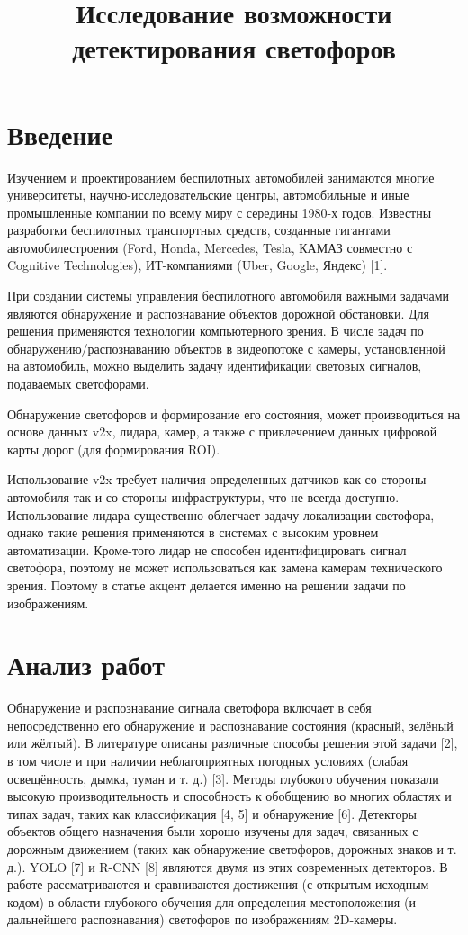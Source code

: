 \documentclass{misisarticle}
\title{Исследование возможности детектирования светофоров}
\begin{document}
\maketitle

\section{Введение}

Изучением и проектированием беспилотных автомобилей занимаются многие университеты, научно-исследовательские центры, автомобильные и иные промышленные компании по всему миру с середины 1980-х годов. Известны разработки беспилотных транспортных средств, созданные гигантами автомобилестроения (Ford, Honda, Mercedes, Tesla, КАМАЗ совместно с Cognitive Technologies), ИТ-компаниями (Uber, Google, Яндекс) [1].

При создании системы управления беспилотного автомобиля важными задачами являются обнаружение и распознавание объектов дорожной обстановки. Для решения применяются технологии компьютерного зрения. В числе задач по обнаружению/распознаванию объектов в видеопотоке с камеры, установленной на автомобиль, можно выделить задачу идентификации световых сигналов, подаваемых светофорами.

Обнаружение светофоров и формирование его состояния, может производиться на основе данных v2x, лидара, камер, а также с привлечением данных цифровой карты дорог (для формирования ROI).

Использование v2x требует наличия определенных датчиков как со стороны автомобиля так и со стороны инфраструктуры, что не всегда доступно. 
Использование лидара существенно облегчает задачу локализации светофора, однако такие решения применяются в системах с высоким уровнем автоматизации. Кроме-того лидар не способен идентифицировать сигнал светофора, поэтому не может использоваться как замена камерам технического зрения. Поэтому в статье акцент делается именно на решении задачи по изображениям. 
\section{Анализ работ}
Обнаружение и распознавание сигнала светофора включает в себя непосредственно его обнаружение и распознавание состояния (красный, зелёный или жёлтый). В литературе описаны различные способы решения этой задачи [2], в том числе и при наличии неблагоприятных погодных условиях (слабая освещённость, дымка, туман и т. д.) [3].
Методы глубокого обучения показали высокую производительность и способность к обобщению во многих областях и типах задач, таких как классификация [4, 5] и обнаружение [6]. Детекторы объектов общего назначения были хорошо изучены для задач, связанных с дорожным движением (таких как обнаружение светофоров, дорожных знаков и т. д.). YOLO [7] и R-CNN [8] являются двумя из этих современных детекторов. В работе рассматриваются и сравниваются достижения (с открытым исходным кодом) в области глубокого обучения для определения местоположения (и дальнейшего распознавания) светофоров по изображениям 2D-камеры.
\end{document}
